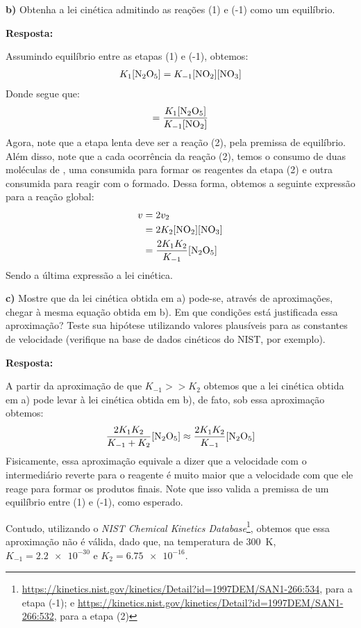 \textbf{b)} Obtenha a lei cinética admitindo as reações (1) e (-1) como um equilíbrio.

\textbf{Resposta:}

Assumindo equilíbrio entre as etapas (1) e (-1), obtemos:
\begin{align*}
    K_1 [\ce{N2O5}] = K_{-1} [\ce{NO2}][\ce{NO3}]
\end{align*}
Donde segue que:
\begin{align*}
    [\ce{NO3}] = \frac{K_1 [\ce{N2O5}]}{K_{-1} [\ce{NO2}]} 
\end{align*}
Agora, note que a etapa lenta deve ser a reação (2), pela premissa de equilíbrio. Além disso, note que a cada ocorrência da reação (2), temos o consumo de duas moléculas de , uma consumida para formar os reagentes da etapa (2) e outra consumida para reagir com o  formado. Dessa forma, obtemos a seguinte expressão para a reação global:
\begin{align*}
    v &= 2 v_2\\
      &= 2 K_2 [\ce{NO2}][\ce{NO3}]\\
      &= \frac{2 K_1 K_2}{K_{-1}} [\ce{N2O5}]
\end{align*}
Sendo a última expressão a lei cinética.

\textbf{c)} Mostre que da lei cinética obtida em a) pode-se, através de aproximações, chegar à mesma equação obtida em b). Em que condições está justificada essa aproximação? Teste sua hipótese utilizando valores plausíveis para as constantes de velocidade (verifique na base de dados cinéticos do NIST, por exemplo).

\textbf{Resposta:}

A partir da aproximação de que \( K_{-1} >> K_2 \) obtemos que a lei cinética obtida em a) pode levar à lei cinética obtida em b), de fato, sob essa aproximação obtemos:
\begin{align*}
    \frac{2K_1K_2}{K_{-1} + K_2} [\ce{N2O5}] \approx \frac{2K_1K_2}{K_{-1}} [\ce{N2O5}] 
\end{align*}
Fisicamente, essa aproximação equivale a dizer que a velocidade com o intermediário  reverte para o reagente  é muito maior que a velocidade com que ele reage para formar os produtos finais. Note que isso valida a premissa de um equilíbrio entre (1) e (-1), como esperado.

Contudo, utilizando o \textit{NIST Chemical Kinetics Database}\footnote{\url{https://kinetics.nist.gov/kinetics/Detail?id=1997DEM/SAN1-266:534}, para a etapa (-1); e \url{https://kinetics.nist.gov/kinetics/Detail?id=1997DEM/SAN1-266:532}, para a etapa (2)}, obtemos que essa aproximação não é válida, dado que, na temperatura de \qty{300}{\kelvin}, \( K_{-1} = \num{2.2e-30} \) e \( K_2 = \num{6.75e-16} \). 
